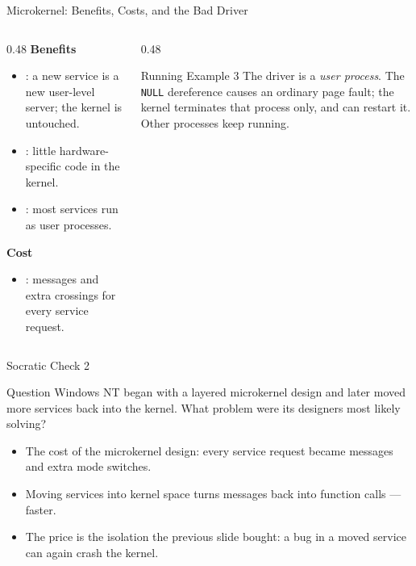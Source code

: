 \documentclass[aspectratio=169]{beamer}
\begin{document}
\begin{frame}{Microkernel: Benefits, Costs, and the Bad Driver}
  \begin{columns}[T]
    \begin{column}{0.48\textwidth}
      \textbf{Benefits}
      \begin{itemize}
        \item {}: a new service is a new user-level server;
          the kernel is untouched.
        \item {}: little hardware-specific code in the kernel.
        \item {}: most services run as user
          processes.
      \end{itemize}
      \textbf{Cost}
      \begin{itemize}
        \item {}: messages and extra crossings for every
          service request.
      \end{itemize}
    \end{column}
    \begin{column}{0.48\textwidth}
      \begin{exampleblock}{Running Example 3}
        The driver is a \emph{user process}. The \texttt{NULL} dereference
        causes an ordinary page fault; the kernel terminates that process
        only, and can restart it.\\[0.3em]
         Other processes keep
        running.
      \end{exampleblock}
    \end{column}
  \end{columns}
  \vspace{0.15cm}
\end{frame}

\begin{frame}{Socratic Check 2}
  \begin{block}{Question}
    Windows NT began with a layered microkernel design and later moved more
    services back into the kernel. What problem were its designers most
    likely solving?
  \end{block}
  \vspace{0.25cm}
  \begin{itemize}
    \item The cost of the microkernel design: every service request became
      messages and extra mode switches.
    \item Moving services into kernel space turns messages back into function
      calls --- faster.
    \item The price is the isolation the previous slide bought: a bug in a
      moved service can again crash the kernel.
  \end{itemize}
\end{frame}
\end{document}

